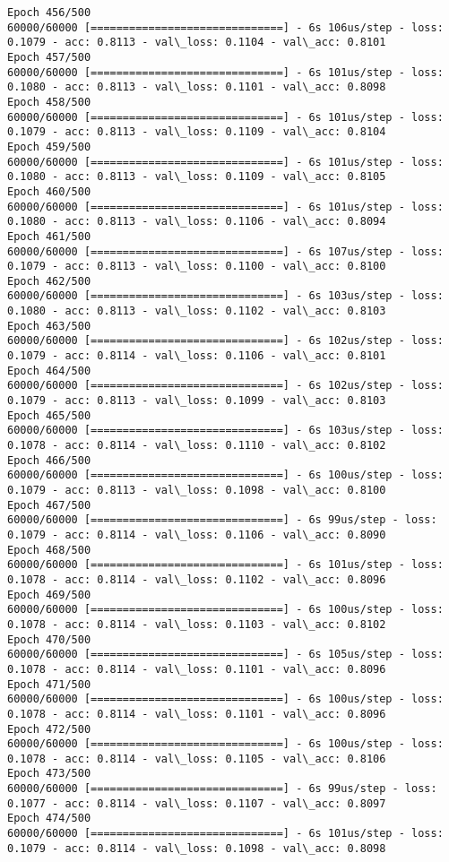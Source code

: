 \documentclass[11pt]{article}
\begin{document}
\begin{Verbatim}[commandchars=\\\{\}]
Epoch 456/500
60000/60000 [==============================] - 6s 106us/step - loss: 0.1079 - acc: 0.8113 - val\_loss: 0.1104 - val\_acc: 0.8101
Epoch 457/500
60000/60000 [==============================] - 6s 101us/step - loss: 0.1080 - acc: 0.8113 - val\_loss: 0.1101 - val\_acc: 0.8098
Epoch 458/500
60000/60000 [==============================] - 6s 101us/step - loss: 0.1079 - acc: 0.8113 - val\_loss: 0.1109 - val\_acc: 0.8104
Epoch 459/500
60000/60000 [==============================] - 6s 101us/step - loss: 0.1080 - acc: 0.8113 - val\_loss: 0.1109 - val\_acc: 0.8105
Epoch 460/500
60000/60000 [==============================] - 6s 101us/step - loss: 0.1080 - acc: 0.8113 - val\_loss: 0.1106 - val\_acc: 0.8094
Epoch 461/500
60000/60000 [==============================] - 6s 107us/step - loss: 0.1079 - acc: 0.8113 - val\_loss: 0.1100 - val\_acc: 0.8100
Epoch 462/500
60000/60000 [==============================] - 6s 103us/step - loss: 0.1080 - acc: 0.8113 - val\_loss: 0.1102 - val\_acc: 0.8103
Epoch 463/500
60000/60000 [==============================] - 6s 102us/step - loss: 0.1079 - acc: 0.8114 - val\_loss: 0.1106 - val\_acc: 0.8101
Epoch 464/500
60000/60000 [==============================] - 6s 102us/step - loss: 0.1079 - acc: 0.8113 - val\_loss: 0.1099 - val\_acc: 0.8103
Epoch 465/500
60000/60000 [==============================] - 6s 103us/step - loss: 0.1078 - acc: 0.8114 - val\_loss: 0.1110 - val\_acc: 0.8102
Epoch 466/500
60000/60000 [==============================] - 6s 100us/step - loss: 0.1079 - acc: 0.8113 - val\_loss: 0.1098 - val\_acc: 0.8100
Epoch 467/500
60000/60000 [==============================] - 6s 99us/step - loss: 0.1079 - acc: 0.8114 - val\_loss: 0.1106 - val\_acc: 0.8090
Epoch 468/500
60000/60000 [==============================] - 6s 101us/step - loss: 0.1078 - acc: 0.8114 - val\_loss: 0.1102 - val\_acc: 0.8096
Epoch 469/500
60000/60000 [==============================] - 6s 100us/step - loss: 0.1078 - acc: 0.8114 - val\_loss: 0.1103 - val\_acc: 0.8102
Epoch 470/500
60000/60000 [==============================] - 6s 105us/step - loss: 0.1078 - acc: 0.8114 - val\_loss: 0.1101 - val\_acc: 0.8096
Epoch 471/500
60000/60000 [==============================] - 6s 100us/step - loss: 0.1078 - acc: 0.8114 - val\_loss: 0.1101 - val\_acc: 0.8096
Epoch 472/500
60000/60000 [==============================] - 6s 100us/step - loss: 0.1078 - acc: 0.8114 - val\_loss: 0.1105 - val\_acc: 0.8106
Epoch 473/500
60000/60000 [==============================] - 6s 99us/step - loss: 0.1077 - acc: 0.8114 - val\_loss: 0.1107 - val\_acc: 0.8097
Epoch 474/500
60000/60000 [==============================] - 6s 101us/step - loss: 0.1079 - acc: 0.8114 - val\_loss: 0.1098 - val\_acc: 0.8098

\end{Verbatim}
\end{document}
